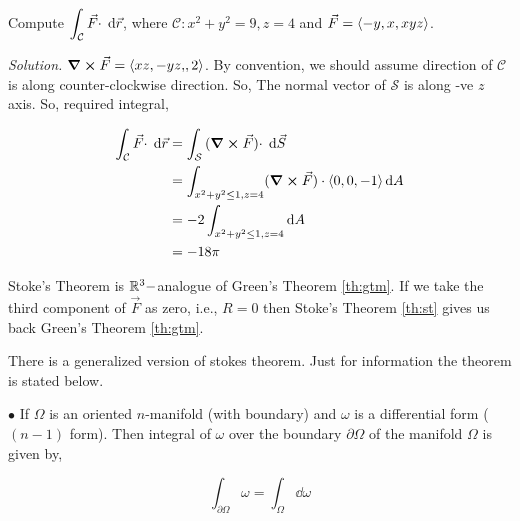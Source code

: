 \documentclass[../Analysis-3]{subfiles}
\begin{document}
\begin{Eg}{}{}
    Compute $\displaystyle\int_{\mathcal{C}} {\vec{F} \cdot } \hspace{0.1cm} \dd {\vec{r}}$, where $\mathcal{C} : x^2 +y^2 = 9, z =4$ and $\vec{F} = \left\langle {-y,x}, {xyz} \right\rangle$.

    \textit{Solution.} $\curl \vec{F} = \left\langle {xz,-yz,}, {2} \right\rangle$. By convention, we should assume direction of $\mathcal{C}$ is along counter-clockwise direction. So,  The normal vector of $\mathcal{S}$ is along -ve $z$ axis. So, required integral,

    \begin{align*}
        \int_{\mathcal{C}} {\vec{F} \cdot } \hspace{0.1cm} \dd {\vec{r}} & = \int_{\mathcal{S}} {(\curl \vec{F}) \cdot} \hspace{0.1cm} \dd {\vec{S}}                     \\
                                                    & = \int_{x^2+y^2 \le 1, z =4 } (\curl \vec{F}) \cdot \left\langle {0,0}, {-1} \right\rangle \dd{A} \\
                                                    & = -2 \int_{x^2+y^2 \le 1, z =4} \dd{A}                                   \\
                                                    & = -18\pi
    \end{align*}

\end{Eg}


Stoke's Theorem is $\mathbb{R}^3-$analogue of Green's Theorem \ref{th:gtm}. If we take the third component of $\vec{F}$ as zero, i.e., $R = 0$ then Stoke's Theorem \ref{th:st} gives us back Green's Theorem \ref{th:gtm}.

\begin{tcolorbox}
    There is a generalized version of stokes theorem. Just for information the theorem is stated below.

    $\bullet$ If $\Omega$ is an oriented $n$-manifold (with boundary) and $\omega$ is a differential form ($(n-1)$ form). Then integral of $\omega$ over the boundary $\partial \Omega$ of the manifold $\Omega$ is given by,

    \[\int_{\partial \Omega} \omega = \int_{\Omega} \dd \omega\]

\end{tcolorbox}
\end{document}

